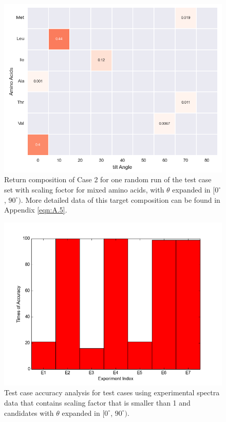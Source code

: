 \begin{figure}[!ht] 
\centering
\includegraphics[scale=0.7]{Figures/chapter6_figure_two.png}
\caption{Return composition of Case 2 for one random run of the test case set with scaling foctor for mixed amino acids, with $\theta$ expanded in $[0^{\circ}$, $90^{\circ})$. More detailed data of this target composition can be found in Appendix \ref{eqn:A.5}.} \label{fig:6.2}
\end{figure}

\begin{figure}[!ht] 
\centering
\includegraphics[scale=0.6]{Figures/chapter6_1.png}
\caption{Test case accuracy analysis for test cases using experimental spectra data that contains scaling factor that is smaller than 1 and candidates with $\theta$ expanded in  $[0^{\circ}$, $90^{\circ})$.}
\label{fig:6.3}
\end{figure}

